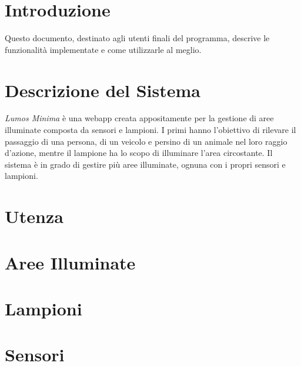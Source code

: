 \documentclass[a4paper, 12pt]{article}
\begin{document}
\makeindexdetails
\makefrontpage \makeversioni
\tableofcontents
\newpage
\clearpage
{}
\newpage
\section{Introduzione}
Questo documento, destinato agli utenti finali del programma, descrive le funzionalità implementate e come utilizzarle al meglio.

\newpage
\section{Descrizione del Sistema}
\textit{Lumos Minima} è una webapp creata appositamente per la gestione di aree illuminate composta da sensori e lampioni. I primi hanno l'obiettivo di rilevare il passaggio di una persona, di un veicolo e persino di un animale nel loro raggio d'azione, mentre il lampione ha lo scopo di illuminare l'area circostante. Il sistema è in grado di gestire più aree illuminate, ognuna con i propri sensori e lampioni.\\

\newpage
\section{Utenza}

\newpage
\section{Aree Illuminate}

\newpage
\section{Lampioni}

\newpage
\section{Sensori}
\end{document}
